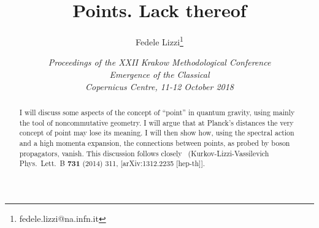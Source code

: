 \documentclass[12pt,a4paper]{article}
\begin{document}
\setlength{\droptitle}{-6pc}

\title{Points. Lack thereof}

\renewcommand\Affilfont{\itshape}
\setlength{\affilsep}{1.5em}


\author[1,2,3]{Fedele Lizzi\thanks{fedele.lizzi@na.infn.it}}


\date{\sl Proceedings of the XXII Krakow Methodological Conference\\ \textit{Emergence
of the Classical}\\Copernicus Centre, 11-12 October 2018}

\maketitle 

\begin{abstract}\noindent
I will discuss some aspects of the concept of ``point'' in quantum gravity, using mainly the tool of noncommutative geometry. I will argue that at Planck's distances the very concept of point may lose its meaning. I will then show how, using the spectral action and a high momenta expansion,  the connections between points, as probed by boson propagators, vanish. This discussion follows closely~\cite{Kuliva} (Kurkov-Lizzi-Vassilevich Phys.\ Lett.\ B {\bf 731} (2014) 311, 
  [arXiv:1312.2235 [hep-th]].
\end{abstract}
\newpage
\end{document}
